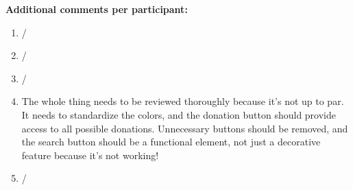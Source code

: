 \vspace{0.25cm}

\textbf{Additional comments per participant:}
\begin{enumerate}
	\item /
	\item /
	\item /
	\item The whole thing needs to be reviewed thoroughly because it's not up to par. It needs to standardize the colors, and the donation button should provide access to all possible donations. Unnecessary buttons should be removed, and the search button should be a functional element, not just a decorative feature because it's not working!
	\item /
\end{enumerate}